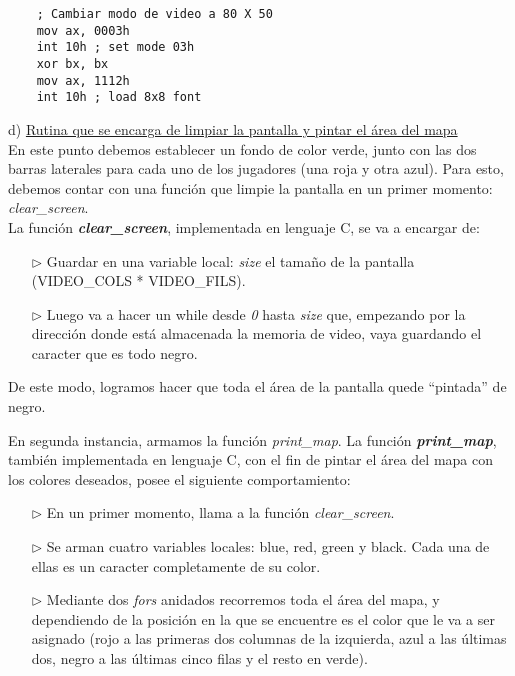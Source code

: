 \documentclass[a4paper]{article}
\begin{document}
\begin{codesnippet}
\begin{verbatim}
    ; Cambiar modo de video a 80 X 50
    mov ax, 0003h
    int 10h ; set mode 03h
    xor bx, bx
    mov ax, 1112h
    int 10h ; load 8x8 font
\end{verbatim}
\end{codesnippet}


{\large d)} \underline{Rutina que se encarga de limpiar la pantalla y pintar el \'area del mapa}
\\

En este punto debemos establecer un fondo de color verde, junto con las dos barras laterales para cada uno de los jugadores (una roja y otra azul). Para esto, debemos contar con una funci\'on que limpie la pantalla en un primer momento: \emph{clear_screen}.\\

La funci\'on \textbf{\textit{clear_screen}}, implementada en lenguaje C, se va a encargar de: 

\begin{itemize}
\item[$\triangleright$] Guardar en una variable local: \emph{size} el tama\~no de la pantalla (VIDEO_COLS * VIDEO_FILS).
\item[$\triangleright$] Luego va a hacer un while desde \emph{0} hasta \emph{size} que, empezando por la direcci\'on donde est\'a almacenada la memoria de video, vaya guardando el caracter que es todo negro.
\end{itemize}

De este  modo, logramos hacer que toda el \'area de la pantalla quede ``pintada'' de negro. \\

\bigskip

En segunda instancia, armamos la funci\'on \emph{print_map}. La funci\'on \textbf{\textit{print_map}}, tambi\'en implementada en lenguaje C, con el fin de pintar el \'area del mapa con los colores deseados, posee el siguiente comportamiento:

\begin{itemize}
\item[$\triangleright$] En un primer momento, llama a la funci\'on \emph{clear_screen}.
\item[$\triangleright$] Se arman cuatro variables locales: blue, red, green y black. Cada una de ellas es un caracter completamente de su color.
\item[$\triangleright$] Mediante dos \textit{fors} anidados recorremos toda el \'area del mapa, y dependiendo de la posici\'on en la que se encuentre es el color que le va a ser asignado (rojo a las primeras dos columnas de la izquierda, azul a las \'ultimas dos, negro a las \'ultimas cinco filas y el resto en verde).
\end{itemize}
\end{document}
